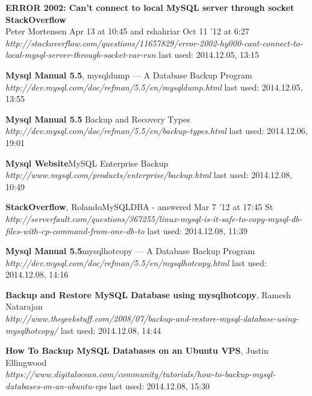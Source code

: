 \documentclass[10pt]{article}
\begin{document}
\newpage
\begin{thebibliography}{56}

  
  \textbf{ERROR 2002: Can't connect to local MySQL server through socket \\ StackOverflow} \\ Peter Mortensen Apr 13 at 10:45 and  rshahriar Oct 11 '12 at 6:27 \\
  \textit{http://stackoverflow.com/questions/11657829/error-2002-hy000-cant-connect-to-local-mysql-server-through-socket-var-run}
  \newline last used: 2014.12.05, 13:15
 
  \textbf{Mysql Manual 5.5}, mysqldump — A Database Backup Program\\
  \textit{http://dev.mysql.com/doc/refman/5.5/en/mysqldump.html}
  \newline last used: 2014.12.05, 13:55
    
  \textbf{Mysql Manual 5.5} Backup and Recovery Types\\
  \textit{http://dev.mysql.com/doc/refman/5.5/en/backup-types.html}
  \newline last used: 2014.12.06, 19:01
  
  \textbf{Mysql Website}MySQL Enterprise Backup\\
  \textit{http://www.mysql.com/products/enterprise/backup.html}
  \newline last used: 2014.12.08, 10:49

  \textbf{StackOverflow}, RolandoMySQLDBA - answered Mar 7 '12 at 17:45 St\\
  \textit{http://serverfault.com/questions/367255/linux-mysql-is-it-safe-to-copy-mysql-db-files-with-cp-command-from-one-db-to
}
  \newline last used: 2014.12.08, 11:39


  \textbf{Mysql Manual 5.5}mysqlhotcopy — A Database Backup Program\\
  \textit{http://dev.mysql.com/doc/refman/5.5/en/mysqlhotcopy.html}
  \newline last used: 2014.12.08, 14:16

  \textbf{Backup and Restore MySQL Database using mysqlhotcopy},  Ramesh Natarajan \\
  \textit{http://www.thegeekstuff.com/2008/07/backup-and-restore-mysql-database-using-mysqlhotcopy/}
  \newline last used: 2014.12.08, 14:44
  
  \textbf{How To Backup MySQL Databases on an Ubuntu VPS},  Justin Ellingwood \\
  \textit{https://www.digitalocean.com/community/tutorials/how-to-backup-mysql-databases-on-an-ubuntu-vps}
  \newline last used: 2014.12.08, 15:30
  
  
\end{thebibliography}
\end{document}
